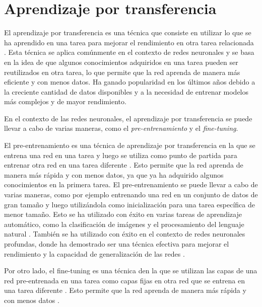 \section{Aprendizaje por transferencia}

El aprendizaje por transferencia es una técnica que consiste en utilizar lo que se ha aprendido en una tarea para
mejorar el rendimiento en otra tarea relacionada \parencite{thrun1998learning}. Esta técnica se aplica comúnmente en el contexto de redes neuronales y se basa en la idea de
que algunos conocimientos adquiridos en una tarea pueden ser reutilizados en otra tarea, lo que permite que la red
aprenda de manera más eficiente y con menos datos. Ha ganado popularidad en los últimos años debido a la creciente
cantidad de datos disponibles y a la necesidad de entrenar modelos más complejos y de mayor rendimiento.

En el contexto de las redes neuronales, el aprendizaje por transferencia se puede llevar a cabo de varias maneras, como
el {\it pre-entrenamiento} y el {\it fine-tuning}.

El pre-entrenamiento es una técnica de aprendizaje por transferencia en la que se entrena una red en una tarea y luego
se utiliza como punto de partida para entrenar otra red en una tarea diferente \parencite{erhan2010does}. Esto permite que la red aprenda de manera más rápida y con menos datos, ya que ya ha adquirido
algunos conocimientos en la primera tarea. El pre-entrenamiento se puede llevar a cabo de varias maneras, como por
ejemplo entrenando una red en un conjunto de datos de gran tamaño y luego utilizándola como inicialización para una
tarea específica de menor tamaño. Esto se ha utilizado con éxito en varias tareas de aprendizaje automático, como la
clasificación de imágenes y el procesamiento del lenguaje natural \parencite{howard2017mobilenets}. También se ha utilizado con éxito en el contexto de redes neuronales profundas, donde ha
demostrado ser una técnica efectiva para mejorar el rendimiento y la capacidad de generalización de las redes \parencite{girshick2014rich}.

Por otro lado, el fine-tuning es una técnica den la que se utilizan las capas de una red pre-entrenada en una tarea
como capas fijas en otra red que se entrena en una tarea diferente \parencite{yosinski2014transferable}. Esto permite que la red aprenda de manera más rápida y con menos datos \parencite{howard2018universal}.

